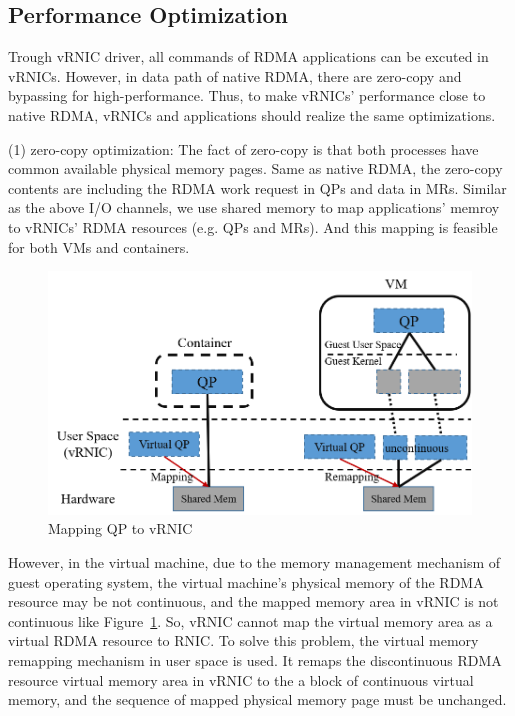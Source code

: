 \subsection{Performance Optimization}

Trough vRNIC driver, all commands of RDMA applications can be excuted in vRNICs. However, in data path of native RDMA, there are zero-copy and bypassing for high-performance. Thus, to make vRNICs' performance close to native RDMA, vRNICs and applications should realize the same optimizations.

(1) zero-copy optimization: The fact of zero-copy is that both processes have common available physical memory pages. Same as native RDMA, the zero-copy contents are including the RDMA work request in QPs and data in MRs. 
Similar as the above I/O channels, we use shared memory to map applications' memroy to vRNICs' RDMA resources (e.g. QPs and MRs). And this mapping is feasible for both VMs and containers.

\begin{figure}[!ht]
	\centering
	\includegraphics[width=1.0\linewidth]{images/zero-copy}
	\caption{Mapping QP to vRNIC}
	\label{fig:zero-copy}
\end{figure}

However, in the virtual machine, due to the memory management mechanism of guest operating system, the virtual machine's physical memory of the RDMA resource may be not continuous, and the mapped memory area in vRNIC is not continuous like Figure~\ref{fig:zero-copy}. So, vRNIC cannot map the virtual memory area as a virtual RDMA resource to RNIC. To solve this problem, the virtual memory remapping mechanism in user space is used. It remaps the discontinuous RDMA resource virtual memory area in vRNIC to the a block of continuous virtual memory, and the sequence of mapped physical memory page must be unchanged.


